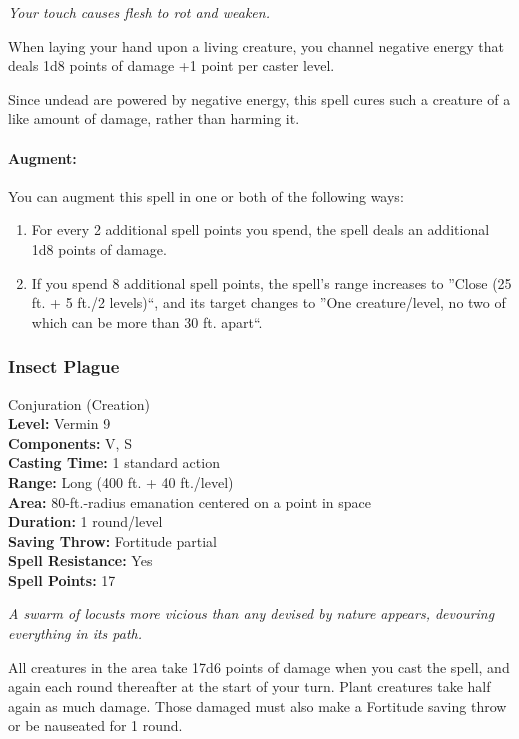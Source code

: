 \emph{Your touch causes flesh to rot and weaken.}

When laying your hand upon a living creature, you channel negative energy that deals 1d8 points of damage +1 point per caster level.

Since undead are powered by negative energy, this spell cures such a creature of a like amount of damage, rather than harming it.

\paragraph{Augment:} You can augment this spell in one or both of the following ways:
\begin{enumerate}
 \item For every 2 additional spell points you spend, the spell deals an additional 1d8 points of damage.
 \item If you spend 8 additional spell points, the spell's range increases to ''Close (25 ft. + 5 ft./2 levels)``, 
and its target changes to ''One creature/level, no two of which can be more than 30 ft. apart``.
\end{enumerate}
\subsubsection{Insect Plague}
\label{Spell:InsectPlague}
Conjuration (Creation)
\\ \textbf{Level:} Vermin 9
\\ \textbf{Components:} V, S
\\ \textbf{Casting Time:} 1 standard action
\\ \textbf{Range:} Long (400 ft. + 40 ft./level)
\\ \textbf{Area:} 80-ft.-radius emanation centered on a point in space
\\ \textbf{Duration:} 1 round/level
\\ \textbf{Saving Throw:} Fortitude partial
\\ \textbf{Spell Resistance:} Yes
\\ \textbf{Spell Points:} 17

\emph{A swarm of locusts more vicious than any devised by nature appears, devouring everything in its path.}

All creatures in the area take 17d6 points of damage when you cast the spell, and again each round thereafter at the start of your turn.
Plant creatures take half again as much damage.
Those damaged must also make a Fortitude saving throw or be nauseated for 1 round.

